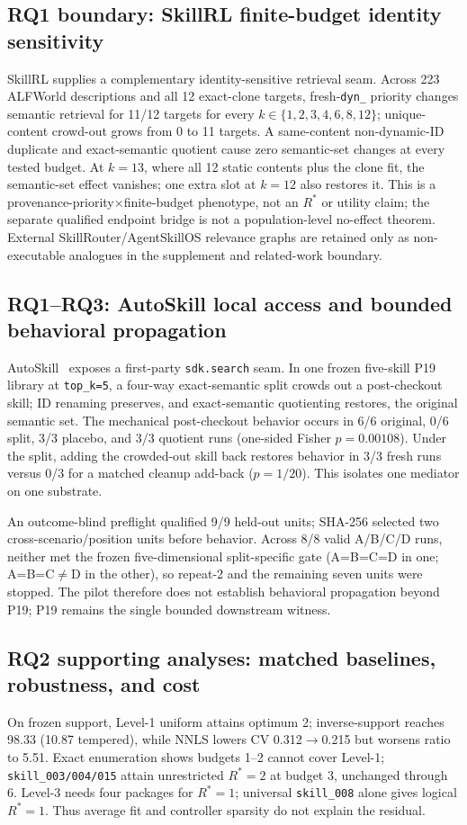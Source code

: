 \subsection{RQ1 boundary: SkillRL finite-budget identity sensitivity}
SkillRL supplies a complementary identity-sensitive retrieval seam. Across 223 ALFWorld descriptions and all 12 exact-clone targets, fresh-\texttt{dyn\_} priority changes semantic retrieval for 11/12 targets for every $k\in\{1,2,3,4,6,8,12\}$; unique-content crowd-out grows from 0 to 11 targets. A same-content non-dynamic-ID duplicate and exact-semantic quotient cause zero semantic-set changes at every tested budget. At $k=13$, where all 12 static contents plus the clone fit, the semantic-set effect vanishes; one extra slot at $k=12$ also restores it. This is a provenance-priority$\times$finite-budget phenotype, not an $R^*$ or utility claim; the separate qualified endpoint bridge is not a population-level no-effect theorem. External SkillRouter/AgentSkillOS relevance graphs are retained only as non-executable analogues in the supplement and related-work boundary.

\subsection{RQ1--RQ3: AutoSkill local access and bounded behavioral propagation}
AutoSkill~\citep{yang2026autoskill} exposes a first-party \texttt{sdk.search} seam. In one frozen five-skill P19 library at \texttt{top\_k=5}, a four-way exact-semantic split crowds out a post-checkout skill; ID renaming preserves, and exact-semantic quotienting restores, the original semantic set. The mechanical post-checkout behavior occurs in 6/6 original, 0/6 split, 3/3 placebo, and 3/3 quotient runs (one-sided Fisher $p=0.00108$). Under the split, adding the crowded-out skill back restores behavior in 3/3 fresh runs versus 0/3 for a matched cleanup add-back ($p=1/20$). This isolates one mediator on one substrate.

An outcome-blind preflight qualified 9/9 held-out units; SHA-256 selected two cross-scenario/position units before behavior. Across 8/8 valid A/B/C/D runs, neither met the frozen five-dimensional split-specific gate (A=B=C=D in one; A=B=C$\ne$D in the other), so repeat-2 and the remaining seven units were stopped. The pilot therefore does not establish behavioral propagation beyond P19; P19 remains the single bounded downstream witness.

\subsection{RQ2 supporting analyses: matched baselines, robustness, and cost}
On frozen support, Level-1 uniform attains optimum 2; inverse-support reaches 98.33 (10.87 tempered), while NNLS lowers CV 0.312$\to$0.215 but worsens ratio to 5.51. Exact enumeration shows budgets 1--2 cannot cover Level-1; \texttt{skill\_003/004/015} attain unrestricted $R^*=2$ at budget 3, unchanged through 6. Level-3 needs four packages for $R^*=1$; universal \texttt{skill\_008} alone gives logical $R^*=1$. Thus average fit and controller sparsity do not explain the residual.

